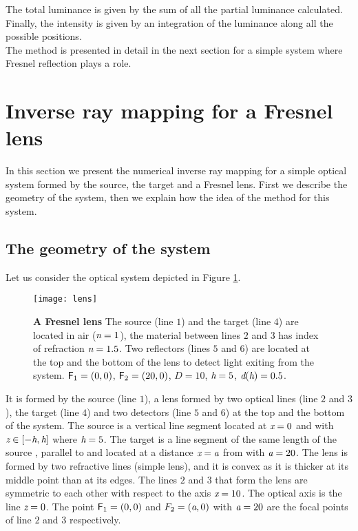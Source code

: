 The total luminance is given by the sum of all the partial luminance calculated.
Finally, the intensity is given by an integration of the luminance along all the possible positions.
\\ \indent
The method is presented in detail in the next section for a simple system where Fresnel reflection plays a role.
\section{Inverse ray mapping for a Fresnel lens}
In this section we present the numerical  inverse ray mapping for a simple optical system formed by the source, the target and a Fresnel lens.
First we describe the geometry of the system, then we explain how the idea of the method for this system.
\subsection{The geometry of the system}
Let us consider the optical system depicted in Figure \ref{fig:lens}. 
\begin{figure}[t]
  \begin{center}
  \texttt{[image: lens]}
  \end{center}
  \caption{\textbf{A Fresnel lens}
The source (line $1$) and the target (line $4$) are located in air ($\textit{n} = 1$), the material between lines $2$ and $3$ has index of refraction $\textit{n}=1.5$. 
Two reflectors (lines $5$ and $6$) are located at the top and the bottom of the lens to detect light exiting from the system. $\textsf{F}_1 = (0,0)$, $\textsf{F}_2 = (20,0)$, $D=10$, $\textit{h}=5$, $\textit{d}(\textit{h})=0.5$.}
\label{fig:lens}
 \end{figure}
It is formed by the source (line $1$), a lens formed by two optical lines (line $2$ and $3$), the target (line $4$) and two detectors (line $5$ and $6$) at the top and the bottom of the system. The source  is a vertical line segment located at $\textit{x}=0$ and with 
$\textit{z}\in[-\textit{h}, \textit{h}]$ where $\textit{h}=5$. The target  is a line segment of the same length of the source , parallel to  and located at a distance $\textit{x}=\textit{a}$ from  with $\textit{a} = 20$. The lens is formed by two refractive lines (simple lens), and it is convex as it is thicker at its middle point than at its edges.
The lines $2$ and $3$ that form the lens are symmetric to each other with respect to the axis $\textit{x}=10$. The optical axis is the line $\textit{z}=0$. The point $\textsf{F}_1 = (0,0)$ and $F_2 = (\textit{a}, 0)$ with $\textit{a} = 20$ are the focal points of line $2$ and $3$ respectively.
